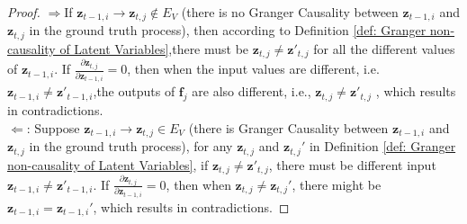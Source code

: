 \begin{proof}
    $\Rightarrow$If $\mathbf{z}_{t-1,i} \rightarrow \mathbf{z}_{t,j} \notin E_V$ (there is no Granger Causality between $\mathbf{z}_{t-1,i}$ and $\mathbf{z}_{t,j}$ in the ground truth process), then according to Definition \ref{def: Granger non-causality of Latent Variables},there must be $\mathbf{z}_{t,j}\neq \mathbf{z}'_{t,j}$ for all the different values of $\mathbf{z}_{t-1,i}$. If  $\frac{\partial \mathbf{z}_{t,j}}{\partial  \mathbf{z}_{t-1,i}}=0$, then when the input values are different, i.e. $\mathbf{z}_{t-1,i} \neq \mathbf{z}'_{t-1,i}$,the outputs of $\mathbf{f}_j$ are also different, i.e., $\mathbf{z}_{t,j}\neq \mathbf{z}'_{t,j}$ , which results in contradictions.\\
    $\Leftarrow$: Suppose $\mathbf{z}_{t-1,i} \rightarrow \mathbf{z}_{t,j} \in E_V$ (there is Granger Causality between $\mathbf{z}_{t-1,i}$ and $\mathbf{z}_{t,j}$ in the ground truth process), for any $\mathbf{z}_{t,j}$ and $\mathbf{z}_{t,j}'$ in Definition \ref{def: Granger non-causality of Latent Variables}, if $\mathbf{z}_{t,j} \neq \mathbf{z}'_{t,j}$, there must be different input $\mathbf{z}_{t-1,i} \neq \mathbf{z}'_{t-1,i}$. If $\frac{\partial \mathbf{z}_{t,j}}{\partial  \mathbf{z}_{t-1,i}}=0$, then when $\mathbf{z}_{t,j} \neq \mathbf{z}_{t,j}'$, there might be $\mathbf{z}_{t-1,i} = \mathbf{z}_{t-1,i}'$, which results in contradictions.
    
\end{proof}




